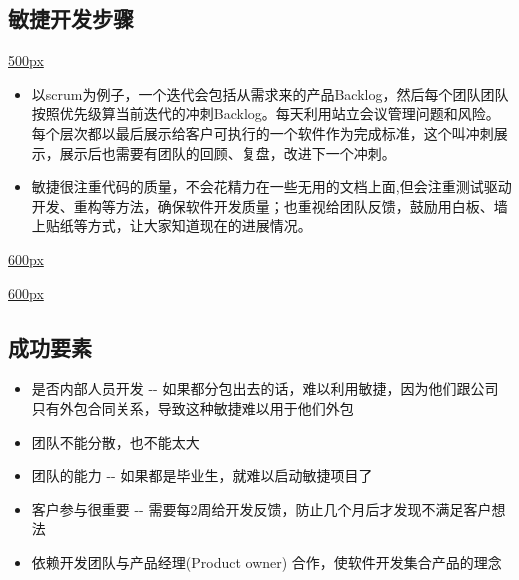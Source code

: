 \documentclass[]{article}
\providecommand{\tightlist}{%
  \setlength{\itemsep}{0pt}\setlength{\parskip}{0pt}}
\begin{document}
\hypertarget{ux654fux6377ux5f00ux53d1ux6b65ux9aa4}{%
\subsection{敏捷开发步骤}\label{ux654fux6377ux5f00ux53d1ux6b65ux9aa4}}

\href{文件:0A_Agile_stories_p13.jpg}{500px}

\begin{itemize}
\tightlist
\item
  以scrum为例子，一个迭代会包括从需求来的产品Backlog，然后每个团队团队按照优先级算当前迭代的冲刺Backlog。每天利用站立会议管理问题和风险。每个层次都以最后展示给客户可执行的一个软件作为完成标准，这个叫冲刺展示，展示后也需要有团队的回顾、复盘，改进下一个冲刺。\\
\item
  敏捷很注重代码的质量，不会花精力在一些无用的文档上面,但会注重测试驱动开发、重构等方法，确保软件开发质量；也重视给团队反馈，鼓励用白板、墙上贴纸等方式，让大家知道现在的进展情况。
\end{itemize}

\href{文件:P12-1.jpg}{600px}

\href{文件:P12-2.jpg}{600px}

\hypertarget{ux6210ux529fux8981ux7d20}{%
\subsection{成功要素}\label{ux6210ux529fux8981ux7d20}}

\begin{itemize}
\tightlist
\item
  是否内部人员开发 -\/-
  如果都分包出去的话，难以利用敏捷，因为他们跟公司只有外包合同关系，导致这种敏捷难以用于他们外包
\item
  团队不能分散，也不能太大
\item
  团队的能力 -\/- 如果都是毕业生，就难以启动敏捷项目了
\item
  客户参与很重要 -\/-
  需要每2周给开发反馈，防止几个月后才发现不满足客户想法
\item
  依赖开发团队与产品经理(Product owner) 合作，使软件开发集合产品的理念
\end{itemize}
\end{document}
